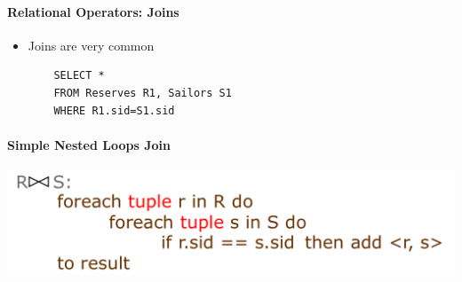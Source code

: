 \paragraph{Relational Operators: Joins}
\begin{itemize}
\item Joins are very common

  \begin{lstlisting}
    SELECT *
    FROM Reserves R1, Sailors S1
    WHERE R1.sid=S1.sid
  \end{lstlisting}
  
\end{itemize}

\paragraph{Simple Nested Loops Join}

\includegraphics[scale=0.2]{graphics/nested-loop-join.png}

